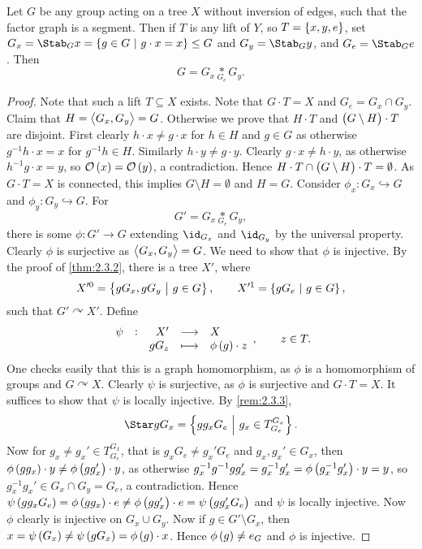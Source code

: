 \begin{theorem}
\label{thm:2.3.4}
Let $ G $ be any group acting on a tree $ X $ without inversion of edges, such that the factor graph is a segment. Then if $ T $ is any lift of $ Y $, so $ T = \cbr{x, y, e} $, set $ G_x = \Stab_G x = \cbr{g \in G \st g \cdot x = x} \le G $ and $ G_y = \Stab_G y $, and $ G_e = \Stab_G e $. Then
$$ G = G_x \underset{G_e}{*} G_y. $$
\end{theorem}

\begin{proof}
Note that such a lift $ T \subseteq X $ exists. Note that $ G \cdot T = X $ and $ G_e = G_x \cap G_y $. Claim that $ H = \left\langle G_x, G_y \right\rangle = G $. Otherwise we prove that $ H \cdot T $ and $ \br{G \setminus H} \cdot T $ are disjoint. First clearly $ h \cdot x \ne g \cdot x $ for $ h \in H $ and $ g \in G $ as otherwise $ g^{-1}h \cdot x = x $ for $ g^{-1}h \in H $. Similarly $ h \cdot y \ne g \cdot y $. Clearly $ g \cdot x \ne h \cdot y $, as otherwise $ h^{-1}g \cdot x = y $, so $ \OOO\br{x} = \OOO\br{y} $, a contradiction. Hence $ H \cdot T \cap \br{G \setminus H} \cdot T = \emptyset $. As $ G \cdot T = X $ is connected, this implies $ G \setminus H = \emptyset $ and $ H = G $. Consider $ \phi_x : G_x \hookrightarrow G $ and $ \phi_y : G_y \hookrightarrow G $. For
$$ G' = G_x \underset{G_e}{*} G_y, $$
there is some $ \phi : G' \to G $ extending $ \id_{G_x} $ and $ \id_{G_y} $ by the universal property. Clearly $ \phi $ is surjective as $ \left\langle G_x, G_y \right\rangle = G $. We need to show that $ \phi $ is injective. By the proof of \ref{thm:2.3.2}, there is a tree $ X' $, where
$$ X'^0 = \cbr{gG_x, gG_y \st g \in G}, \qquad X'^1 = \cbr{gG_e \st g \in G}, $$
such that $ G' \curvearrowright X' $. Define
$$ \function[\psi]{X'}{X}{gG_z}{\phi\br{g} \cdot z}, \qquad z \in T. $$
One checks easily that this is a graph homomorphism, as $ \phi $ is a homomorphism of groups and $ G \curvearrowright X $. Clearly $ \psi $ is surjective, as $ \phi $ is surjective and $ G \cdot T = X $. It suffices to show that $ \psi $ is locally injective. By \ref{rem:2.3.3},
$$ \Star gG_x = \cbr{gg_xG_e \st g_x \in T_{G_e}^{G_x}}. $$
Now for $ g_x \ne g_x' \in T_{G_e}^{G_x} $, that is $ g_xG_e \ne g_x'G_e $ and $ g_x, g_x' \in G_x $, then $ \phi\br{gg_x} \cdot y \ne \phi\br{gg_x'} \cdot y $, as otherwise $ g_x^{-1}g^{-1}gg_x' = g_x^{-1}g_x' = \phi\br{g_x^{-1}g_x'} \cdot y = y $, so $ g_x^{-1}g_x' \in G_x \cap G_y = G_e $, a contradiction. Hence $ \psi\br{gg_xG_e} = \phi\br{gg_x} \cdot e \ne \phi\br{gg_x'} \cdot e = \psi\br{gg_x'G_e} $ and $ \psi $ is locally injective. Now $ \phi $ clearly is injective on $ G_x \cup G_y $. Now if $ g \in G' \setminus G_x $, then $ x = \psi\br{G_x} \ne \psi\br{gG_x} = \phi\br{g} \cdot x $. Hence $ \phi\br{g} \ne e_G $ and $ \phi $ is injective.
\end{proof}

